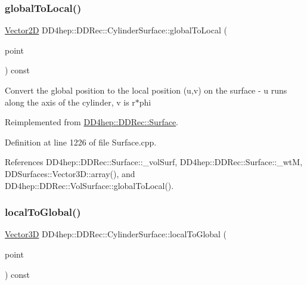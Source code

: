 \subsubsection{\texorpdfstring{global\+To\+Local()}{globalToLocal()}}
{\footnotesize\ttfamily \hyperlink{class_d_d_surfaces_1_1_vector2_d}{Vector2D} D\+D4hep\+::\+D\+D\+Rec\+::\+Cylinder\+Surface\+::global\+To\+Local (\begin{DoxyParamCaption}\item[{const \hyperlink{class_d_d_surfaces_1_1_vector3_d}{Vector3D} \&}]{point }\end{DoxyParamCaption}) const\hspace{0.3cm}{\ttfamily [virtual]}}

Convert the global position to the local position (u,v) on the surface -\/ u runs along the axis of the cylinder, v is r$\ast$phi 

Reimplemented from \hyperlink{class_d_d4hep_1_1_d_d_rec_1_1_surface_ad7ea93419ec45ad4491c84065bd930aa}{D\+D4hep\+::\+D\+D\+Rec\+::\+Surface}.



Definition at line 1226 of file Surface.\+cpp.



References D\+D4hep\+::\+D\+D\+Rec\+::\+Surface\+::\+\_\+vol\+Surf, D\+D4hep\+::\+D\+D\+Rec\+::\+Surface\+::\+\_\+wtM, D\+D\+Surfaces\+::\+Vector3\+D\+::array(), and D\+D4hep\+::\+D\+D\+Rec\+::\+Vol\+Surface\+::global\+To\+Local().

\hypertarget{class_d_d4hep_1_1_d_d_rec_1_1_cylinder_surface_a865ff9150e26d017de4357af5ea77d6b}{}\label{class_d_d4hep_1_1_d_d_rec_1_1_cylinder_surface_a865ff9150e26d017de4357af5ea77d6b} 
\subsubsection{\texorpdfstring{local\+To\+Global()}{localToGlobal()}}
{\footnotesize\ttfamily \hyperlink{class_d_d_surfaces_1_1_vector3_d}{Vector3D} D\+D4hep\+::\+D\+D\+Rec\+::\+Cylinder\+Surface\+::local\+To\+Global (\begin{DoxyParamCaption}\item[{const \hyperlink{class_d_d_surfaces_1_1_vector2_d}{Vector2D} \&}]{point }\end{DoxyParamCaption}) const\hspace{0.3cm}{\ttfamily [virtual]}}

